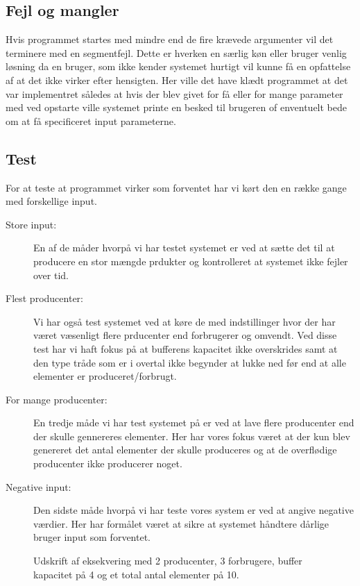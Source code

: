 \documentclass[main.tex]{subfile}
\begin{document}
\subsection{Fejl og mangler}
Hvis programmet startes med mindre end de fire krævede argumenter vil det terminere med en segmentfejl. Dette er hverken en særlig køn eller bruger venlig løsning da en bruger, som ikke kender systemet hurtigt vil kunne få en opfattelse af at det ikke virker efter hensigten. Her ville det have klædt programmet at det var implementret således at hvis der blev givet for få eller for mange parameter med ved opstarte ville systemet printe en besked til brugeren of enventuelt bede om at få specificeret input parameterne. 

\subsection{Test}
For at teste at programmet virker som forventet har vi kørt den en række gange med forskellige input.
\begin{description}
\item[Store input:] En af de måder hvorpå vi har testet systemet er ved at sætte det til at producere en stor mængde prdukter og kontrolleret at systemet ikke fejler over tid. 
\item[Flest producenter:] Vi har også test systemet ved at køre de med indstillinger hvor der har været væsenligt flere prducenter end forbrugerer og omvendt. Ved disse test har vi haft fokus på at bufferens kapacitet ikke overskrides samt at den type tråde som er i overtal ikke begynder at lukke ned før end at alle elementer er produceret/forbrugt.
\item[For mange producenter:] En tredje måde vi har test systemet på er ved at lave flere producenter end der skulle gennereres elementer. Her har vores fokus været at der kun blev genereret det antal elementer der skulle produceres og at de overflødige producenter ikke producerer noget.
\item[Negative input:] Den sidste måde hvorpå vi har teste vores system er ved at angive negative værdier. Her har formålet været at sikre at systemet håndtere dårlige bruger input som forventet.  
\end{description} 


\begin{figure}[H]
\centering
{}
\caption{Udskrift af eksekvering med 2 producenter, 3 forbrugere, buffer kapacitet på 4 og et total antal elementer på 10.}
\end{figure}
\end{document}

